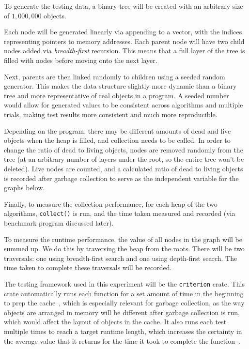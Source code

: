 \documentclass[index]{subfiles}
\begin{document}
To generate the testing data, a binary tree will be created with an arbitrary size of \(1,000,000\) objects.

Each node will be generated linearly via appending to a vector, with the indices representing pointers to memory addresses. Each parent node will have two child nodes added via \textit{breadth-first} recursion. This means that a full layer of the tree is filled with nodes before moving onto the next layer.

Next, parents are then linked randomly to children using a seeded random generator. This makes the data structure slightly more dynamic than a binary tree and more representative of real objects in a program. A seeded number would allow for generated values to be consistent across algorithms and multiple trials, making test results more consistent and much more reproducible.

Depending on the program, there may be different amounts of dead and live objects when the heap is filled, and collection needs to be called. In order to change the ratio of dead to living objects, nodes are removed randomly from the tree (at an arbitrary number of layers under the root, so the entire tree won't be deleted). Live nodes are counted, and a calculated ratio of dead to living objects is recorded after garbage collection to serve as the independent variable for the graphs below.

Finally, to measure the collection performance, for each heap of the two algorithms, \verb+collect()+ is run, and the time taken measured and recorded (via benchmark program discussed later).

To measure the runtime performance, the value of all nodes in the graph will be summed up. We do this by traversing the heap from the roots. There will be two traversals: one using breadth-first search and one using depth-first search. The time taken to complete these traversals will be recorded.

The testing framework used in this experiment will be the \verb+criterion+ crate. This crate automatically runs each function for a set amount of time in the beginning to prep the cache~\parencite{brookheislerAnalysisProcessCriterion}, which is especially relevant for garbage collection, as the way objects are arranged in memory will be different after garbage collection is run, which would affect the layout of objects in the cache. It also runs each test multiple times to reach a target runtime length, which increases the certainty in the average value that it returns for the time it took to complete the function~\parencite{brookheislerAnalysisProcessCriterion}.
\end{document}
